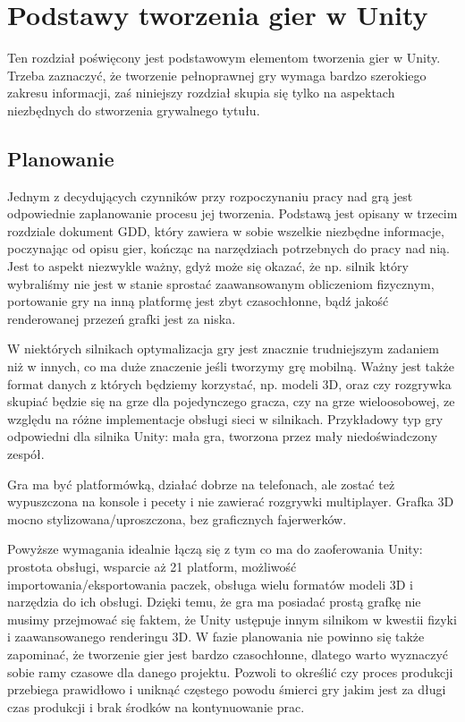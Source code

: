\documentclass[12pt]{xmgr}
\begin{document}
\chapter{Podstawy tworzenia gier w Unity}

Ten rozdział poświęcony jest podstawowym elementom tworzenia gier w Unity. Trzeba zaznaczyć, że tworzenie pełnoprawnej gry wymaga bardzo szerokiego zakresu informacji, zaś niniejszy rozdział skupia się tylko na aspektach niezbędnych do stworzenia grywalnego tytułu.

\section{Planowanie}

Jednym z decydujących czynników przy rozpoczynaniu pracy nad grą jest odpowiednie zaplanowanie procesu jej tworzenia. Podstawą jest opisany w trzecim rozdziale dokument GDD, który zawiera w sobie wszelkie niezbędne informacje, poczynając od opisu gier, kończąc na narzędziach potrzebnych do pracy nad nią. Jest to aspekt niezwykle ważny, gdyż może się okazać, że np. silnik który wybraliśmy nie jest w stanie sprostać zaawansowanym obliczeniom fizycznym, portowanie gry na inną platformę jest zbyt czasochłonne, bądź jakość renderowanej przezeń grafki jest za niska.

W niektórych silnikach optymalizacja gry jest znacznie trudniejszym zadaniem niż w innych, co ma duże znaczenie jeśli tworzymy grę mobilną. Ważny jest także format danych z których będziemy korzystać, np. modeli 3D, oraz czy rozgrywka skupiać będzie się na grze dla pojedynczego gracza, czy na grze wieloosobowej, ze względu na różne implementacje obsługi sieci w silnikach. Przykładowy typ gry odpowiedni dla silnika Unity: mała gra, tworzona przez mały niedoświadczony zespół.

Gra ma być platformówką, działać dobrze na telefonach, ale zostać też wypuszczona na konsole i pecety i nie zawierać rozgrywki multiplayer. Grafka 3D mocno stylizowana/uproszczona, bez graficznych fajerwerków.

Powyższe wymagania idealnie łączą się z tym co ma do zaoferowania Unity: prostota obsługi, wsparcie aż 21 platform, możliwość importowania/eksportowania paczek, obsługa wielu formatów modeli 3D i narzędzia do ich obsługi. Dzięki temu, że gra ma posiadać prostą grafkę nie musimy przejmować się faktem, że Unity ustępuje innym silnikom w kwestii fizyki i zaawansowanego renderingu 3D. W fazie planowania nie powinno się także zapominać, że tworzenie gier jest bardzo czasochłonne, dlatego warto wyznaczyć sobie ramy czasowe dla danego projektu. Pozwoli to określić czy proces produkcji przebiega prawidłowo i uniknąć częstego powodu śmierci gry jakim jest za długi czas produkcji i brak środków na kontynuowanie prac.
\end{document}
